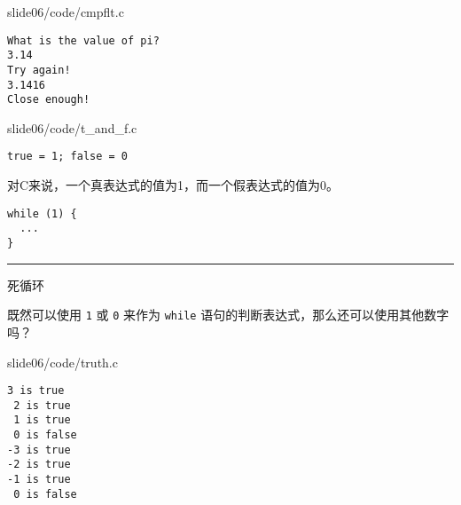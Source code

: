 \begin{frame}[fragile]\ft{\secname}
  
  {slide06/code/cmpflt.c}
\end{frame}

\begin{frame}[fragile]\ft{\secname}
\begin{lstlisting}[backgroundcolor=\color{red!10}]
What is the value of pi?
3.14
Try again!
3.1416
Close enough!
\end{lstlisting}
\end{frame}

\begin{frame}[fragile]
  
  {slide06/code/t_and_f.c}
\pause

\begin{lstlisting}[backgroundcolor=\color{red!20}]
true = 1; false = 0
\end{lstlisting}
\end{frame}

\begin{frame}[fragile]
对C来说，一个真表达式的值为1，而一个假表达式的值为0。\pause 

\begin{lstlisting}
while (1) {
  ...
}
\end{lstlisting}
\rule{\textwidth}{1mm}


死循环
\end{frame}

\begin{frame}[fragile]
\begin{free}[问题]{}
  既然可以使用 \lstinline|1| 或 \lstinline|0| 来作为 \lstinline|while| 语句的判断表达式，那么还可以使用其他数字吗？
\end{free}
\end{frame}

\begin{frame}
  
  {slide06/code/truth.c}    
\end{frame}

\begin{frame}[fragile]
  \begin{lstlisting}[backgroundcolor=\color{blue!20}]
 3 is true
 2 is true
 1 is true
 0 is false
-3 is true
-2 is true
-1 is true
 0 is false
\end{lstlisting}    

\end{frame}

